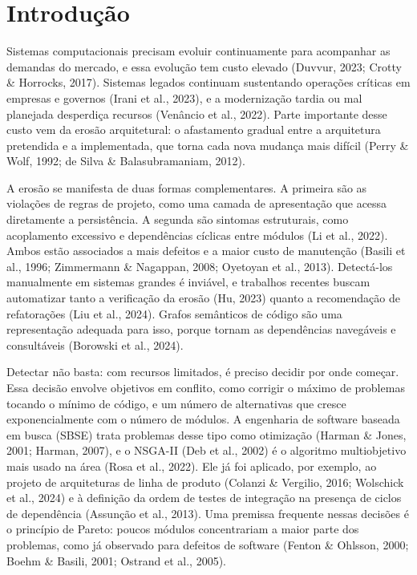 \documentclass[
  a4paper,
]{article}
\begin{document}
\hypertarget{introduuxe7uxe3o}{%
\section{Introdução}\label{introduuxe7uxe3o}}

Sistemas computacionais precisam evoluir continuamente para acompanhar as demandas do mercado, e essa evolução tem custo elevado (Duvvur, 2023; Crotty \& Horrocks, 2017). Sistemas legados continuam sustentando operações críticas em empresas e governos (Irani et al., 2023), e a modernização tardia ou mal planejada desperdiça recursos (Venâncio et al., 2022). Parte importante desse custo vem da erosão arquitetural: o afastamento gradual entre a arquitetura pretendida e a implementada, que torna cada nova mudança mais difícil (Perry \& Wolf, 1992; de Silva \& Balasubramaniam, 2012).

A erosão se manifesta de duas formas complementares. A primeira são as violações de regras de projeto, como uma camada de apresentação que acessa diretamente a persistência. A segunda são sintomas estruturais, como acoplamento excessivo e dependências cíclicas entre módulos (Li et al., 2022). Ambos estão associados a mais defeitos e a maior custo de manutenção (Basili et al., 1996; Zimmermann \& Nagappan, 2008; Oyetoyan et al., 2013). Detectá-los manualmente em sistemas grandes é inviável, e trabalhos recentes buscam automatizar tanto a verificação da erosão (Hu, 2023) quanto a recomendação de refatorações (Liu et al., 2024). Grafos semânticos de código são uma representação adequada para isso, porque tornam as dependências navegáveis e consultáveis (Borowski et al., 2024).

Detectar não basta: com recursos limitados, é preciso decidir por onde começar. Essa decisão envolve objetivos em conflito, como corrigir o máximo de problemas tocando o mínimo de código, e um número de alternativas que cresce exponencialmente com o número de módulos. A engenharia de software baseada em busca (SBSE) trata problemas desse tipo como otimização (Harman \& Jones, 2001; Harman, 2007), e o NSGA-II (Deb et al., 2002) é o algoritmo multiobjetivo mais usado na área (Rosa et al., 2022). Ele já foi aplicado, por exemplo, ao projeto de arquiteturas de linha de produto (Colanzi \& Vergilio, 2016; Wolschick et al., 2024) e à definição da ordem de testes de integração na presença de ciclos de dependência (Assunção et al., 2013). Uma premissa frequente nessas decisões é o princípio de Pareto: poucos módulos concentrariam a maior parte dos problemas, como já observado para defeitos de software (Fenton \& Ohlsson, 2000; Boehm \& Basili, 2001; Ostrand et al., 2005).
\end{document}
